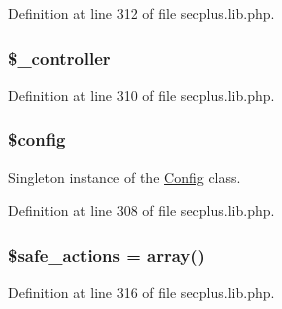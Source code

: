 Definition at line 312 of file secplus.lib.php.

\hypertarget{class_sec_plus_1_1_abstract_controller_aefaf43fa290523c54179f350e96f76c0}{
\subsubsection[{\$\_\-controller}]{\setlength{\rightskip}{0pt plus 5cm}\$\_\-controller}}
\label{class_sec_plus_1_1_abstract_controller_aefaf43fa290523c54179f350e96f76c0}


Definition at line 310 of file secplus.lib.php.

\hypertarget{class_sec_plus_1_1_abstract_controller_a49c7011be9c979d9174c52a8b83e5d8e}{
\subsubsection[{\$config}]{\setlength{\rightskip}{0pt plus 5cm}\$config}}
\label{class_sec_plus_1_1_abstract_controller_a49c7011be9c979d9174c52a8b83e5d8e}
Singleton instance of the \hyperlink{class_sec_plus_1_1_config}{Config} class. 

Definition at line 308 of file secplus.lib.php.

\hypertarget{class_sec_plus_1_1_abstract_controller_a2114141e9aaf630ff155f81f67d7e406}{
\subsubsection[{\$safe\_\-actions}]{\setlength{\rightskip}{0pt plus 5cm}\$safe\_\-actions = array()}}
\label{class_sec_plus_1_1_abstract_controller_a2114141e9aaf630ff155f81f67d7e406}


Definition at line 316 of file secplus.lib.php.

